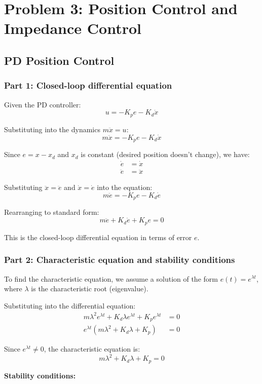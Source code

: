\documentclass[11pt]{article}
\begin{document}
\section{Problem 3: Position Control and Impedance Control}
\subsection{PD Position Control}
\subsubsection*{Part 1: Closed-loop differential equation}

Given the PD controller:
\[
u = -K_p e - K_d \dot{x}
\]

Substituting into the dynamics $m\ddot{x} = u$:
\[
m\ddot{x} = -K_p e - K_d \dot{x}
\]

Since $e = x - x_d$ and $x_d$ is constant (desired position doesn't change), we have:
\begin{align*}
\dot{e} &= \dot{x} \\
\ddot{e} &= \ddot{x}
\end{align*}

Substituting $\ddot{x} = \ddot{e}$ and $\dot{x} = \dot{e}$ into the equation:
\[
m\ddot{e} = -K_p e - K_d \dot{e}
\]

Rearranging to standard form:
\[
\boxed{m\ddot{e} + K_d \dot{e} + K_p e = 0}
\]

This is the closed-loop differential equation in terms of error $e$.

\subsubsection*{Part 2: Characteristic equation and stability conditions}

To find the characteristic equation, we assume a solution of the form $e(t) = e^{\lambda t}$, where $\lambda$ is the characteristic root (eigenvalue).

Substituting into the differential equation:
\begin{align*}
m\lambda^2 e^{\lambda t} + K_d \lambda e^{\lambda t} + K_p e^{\lambda t} &= 0 \\
e^{\lambda t}(m\lambda^2 + K_d \lambda + K_p) &= 0
\end{align*}

Since $e^{\lambda t} \neq 0$, the characteristic equation is:
\[
\boxed{m\lambda^2 + K_d \lambda + K_p = 0}
\]

\textbf{Stability conditions:}
\end{document}
